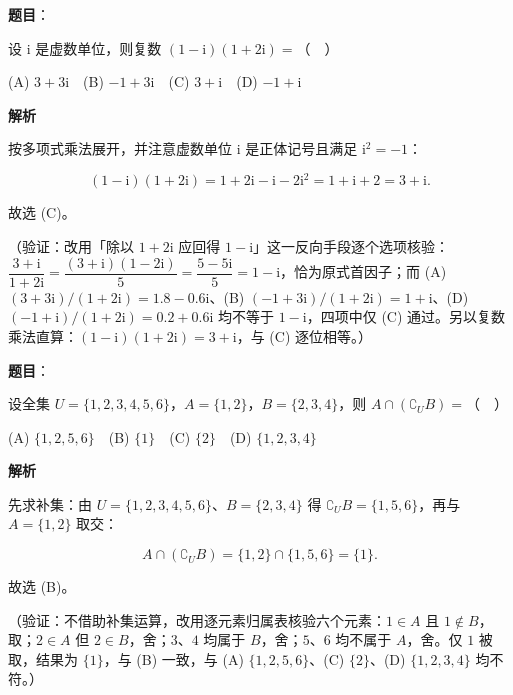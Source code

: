 \begin{answer}

\textbf{题目}：

设 \(\mathrm{i}\) 是虚数单位，则复数 \((1-\mathrm{i})(1+2\mathrm{i})=\)（　）

(A) \(3+3\mathrm{i}\)　(B) \(-1+3\mathrm{i}\)　(C) \(3+\mathrm{i}\)　(D) \(-1+\mathrm{i}\)

\textbf{解析}

按多项式乘法展开，并注意虚数单位 \(\mathrm{i}\) 是正体记号且满足 \(\mathrm{i}^2=-1\)：

\nopagebreak[4]
\[
(1-\mathrm{i})(1+2\mathrm{i})=1+2\mathrm{i}-\mathrm{i}-2\mathrm{i}^2=1+\mathrm{i}+2=3+\mathrm{i}.
\]

故选 (C)。

（验证：改用「除以 \(1+2\mathrm{i}\) 应回得 \(1-\mathrm{i}\)」这一反向手段逐个选项核验：\(\dfrac{3+\mathrm{i}}{1+2\mathrm{i}}=\dfrac{(3+\mathrm{i})(1-2\mathrm{i})}{5}=\dfrac{5-5\mathrm{i}}{5}=1-\mathrm{i}\)，恰为原式首因子；而 (A) \((3+3\mathrm{i})/(1+2\mathrm{i})=1.8-0.6\mathrm{i}\)、(B) \((-1+3\mathrm{i})/(1+2\mathrm{i})=1+\mathrm{i}\)、(D) \((-1+\mathrm{i})/(1+2\mathrm{i})=0.2+0.6\mathrm{i}\) 均不等于 \(1-\mathrm{i}\)，四项中仅 (C) 通过。另以复数乘法直算：\((1-\mathrm{i})(1+2\mathrm{i})=3+\mathrm{i}\)，与 (C) 逐位相等。）


\end{answer}
\begin{answer}

\textbf{题目}：

设全集 \(U=\{1,2,3,4,5,6\}\)，\(A=\{1,2\}\)，\(B=\{2,3,4\}\)，则 \(A\cap(\complement_U B)=\)（　）

(A) \(\{1,2,5,6\}\)　(B) \(\{1\}\)　(C) \(\{2\}\)　(D) \(\{1,2,3,4\}\)

\textbf{解析}

先求补集：由 \(U=\{1,2,3,4,5,6\}\)、\(B=\{2,3,4\}\) 得 \(\complement_U B=\{1,5,6\}\)，再与 \(A=\{1,2\}\) 取交：

\nopagebreak[4]
\[
A\cap(\complement_U B)=\{1,2\}\cap\{1,5,6\}=\{1\}.
\]

故选 (B)。

（验证：不借助补集运算，改用逐元素归属表核验六个元素：\(1\in A\) 且 \(1\notin B\)，取；\(2\in A\) 但 \(2\in B\)，舍；\(3\)、\(4\) 均属于 \(B\)，舍；\(5\)、\(6\) 均不属于 \(A\)，舍。仅 \(1\) 被取，结果为 \(\{1\}\)，与 (B) 一致，与 (A) \(\{1,2,5,6\}\)、(C) \(\{2\}\)、(D) \(\{1,2,3,4\}\) 均不符。）


\end{answer}
